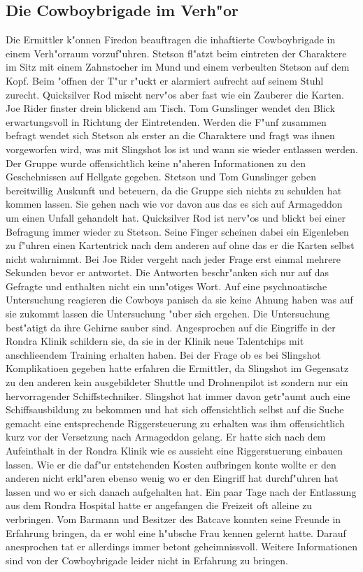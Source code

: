 \subsection{Die Cowboybrigade im Verh"or}

Die Ermittler k"onnen Firedon beauftragen die inhaftierte Cowboybrigade in einem Verh"orraum vorzuf"uhren. Stetson fl"atzt beim eintreten der Charaktere im Sitz mit einem Zahnstocher im Mund und einem verbeulten Stetson auf dem Kopf. Beim "offnen der T"ur r"uckt er alarmiert aufrecht auf seinem Stuhl zurecht. Quicksilver Rod mischt nerv"os aber fast wie ein Zauberer die Karten. Joe Rider finster drein blickend am Tisch. Tom Gunslinger wendet den Blick erwartungsvoll in Richtung der Eintretenden. Werden die F"unf zusammen befragt wendet sich Stetson als erster an die Charaktere und fragt was ihnen vorgeworfen wird, was mit Slingshot los ist und wann sie wieder entlassen werden. Der Gruppe wurde offensichtlich keine n"aheren Informationen zu den Geschehnissen auf Hellgate gegeben. Stetson und Tom Gunslinger geben bereitwillig Auskunft und beteuern, da\3 die Gruppe sich nichts zu schulden hat kommen lassen. Sie gehen nach wie vor davon aus das es sich auf Armageddon um einen Unfall gehandelt hat. Quicksilver Rod ist nerv"os und blickt bei einer Befragung immer wieder zu Stetson. Seine Finger scheinen dabei ein Eigenleben zu f"uhren einen Kartentrick nach dem anderen auf ohne das er die Karten selbst nicht wahrnimmt. Bei Joe Rider vergeht nach jeder Frage erst einmal mehrere Sekunden bevor er antwortet. Die Antworten beschr"anken sich nur auf das Gefragte und enthalten nicht ein unn"otiges Wort. Auf eine psychnoatische Untersuchung reagieren die Cowboys panisch da sie keine Ahnung haben was auf sie zukommt lassen die Untersuchung "uber sich ergehen. Die Untersuchung best"atigt da\3 ihre Gehirne sauber sind. Angesprochen auf die Eingriffe in der Rondra Klinik schildern sie, da\3 sie in der Klinik neue Talentchips mit anschlie\3endem Training erhalten haben. Bei der Frage ob es bei Slingshot Komplikatioen gegeben hatte erfahren die Ermittler, da\3 Slingshot im Gegensatz zu den anderen kein ausgebildeter Shuttle und Drohnenpilot ist sondern nur ein hervorragender Schiffstechniker. Slingshot hat immer davon getr"aumt auch eine Schiffsausbildung zu bekommen und hat sich offensichtlich selbst auf die Suche gemacht eine entsprechende Riggersteuerung zu erhalten was ihm offensichtlich kurz vor der Versetzung nach Armageddon gelang. Er hatte sich nach dem Aufeinthalt in der Rondra Klinik wie es aussieht eine Riggerstuerung einbauen lassen. Wie er die daf"ur entstehenden Kosten aufbringen konte wollte er den anderen nicht erkl"aren ebenso wenig wo er den Eingriff hat durchf"uhren hat lassen und wo er sich danach aufgehalten hat. Ein paar Tage nach der Entlassung aus dem Rondra Hospital hatte er angefangen die Freizeit oft alleine zu verbringen. Vom Barmann und Besitzer des Batcave konnten seine Freunde in Erfahrung bringen, da\3 er wohl eine h"ubsche Frau kennen gelernt hatte. Darauf anesprochen tat er allerdings immer betont geheimnissvoll. Weitere Informationen sind von der Cowboybrigade leider nicht in Erfahrung zu bringen.

